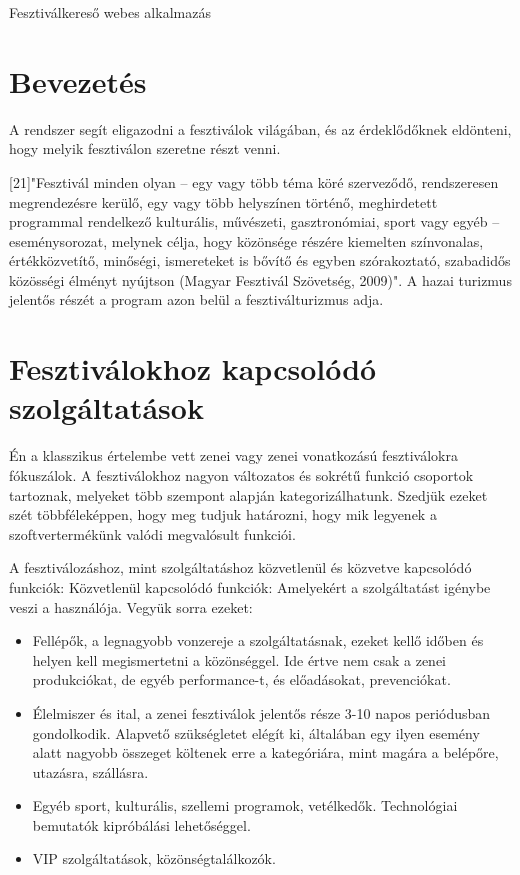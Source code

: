 \documentclass[11pt]{article}
\begin{document}
\begin{center}
\huge Fesztiválkereső webes alkalmazás
\end{center}

\section*{Bevezetés}

A rendszer segít eligazodni a fesztiválok világában, és az érdeklődőknek eldönteni, hogy melyik fesztiválon szeretne részt venni.

[21]"Fesztivál minden olyan – egy vagy több téma köré szerveződő, rendszeresen megrendezésre kerülő, egy vagy több helyszínen történő, meghirdetett programmal rendelkező kulturális, művészeti, gasztronómiai, sport vagy egyéb – eseménysorozat, melynek célja, hogy közönsége részére kiemelten színvonalas, értékközvetítő, minőségi, ismereteket is bővítő és egyben szórakoztató, szabadidős közösségi élményt nyújtson (Magyar Fesztivál Szövetség, 2009)".
A hazai turizmus jelentős részét a program azon belül a fesztiválturizmus adja.

\section{Fesztiválokhoz kapcsolódó szolgáltatások}


Én a klasszikus értelembe vett zenei vagy zenei vonatkozású fesztiválokra fókuszálok.
A fesztiválokhoz nagyon változatos és sokrétű funkció csoportok tartoznak, melyeket több szempont alapján kategorizálhatunk. Szedjük ezeket szét többféleképpen, hogy meg tudjuk határozni, hogy mik legyenek a szoftvertermékünk valódi megvalósult funkciói.

A fesztiválozáshoz, mint szolgáltatáshoz közvetlenül és közvetve kapcsolódó funkciók:
Közvetlenül kapcsolódó funkciók: Amelyekért a szolgáltatást igénybe veszi a használója.
Vegyük sorra ezeket: 
\begin{itemize}
\item Fellépők, a legnagyobb vonzereje a szolgáltatásnak, ezeket kellő időben és helyen kell megismertetni a közönséggel. Ide értve nem csak a zenei produkciókat, de egyéb performance-t, és előadásokat, prevenciókat.
\item Élelmiszer és ital, a zenei fesztiválok jelentős része 3-10 napos periódusban gondolkodik. Alapvető szükségletet elégít ki, általában egy ilyen esemény alatt nagyobb összeget költenek erre a kategóriára, mint magára a belépőre, utazásra, szállásra.
\item Egyéb sport, kulturális, szellemi programok, vetélkedők. Technológiai bemutatók kipróbálási lehetőséggel.
\item VIP szolgáltatások, közönségtalálkozók.
\end{itemize}
\end{document}
